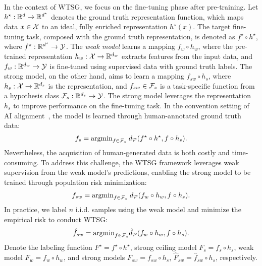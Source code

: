 In the context of WTSG, we focus on the fine-tuning phase after pre-training.
Let $h^\star:\mathbb{R}^d \to \mathbb{R}^{d^\star}$ denotes the ground truth representation function, which maps data $x \in \mathcal{X}$ to an ideal, fully enriched representation $h^\star(x)$. 
The target fine-tuning task, composed with the ground truth representation, is denoted as $f^\star \circ h^\star$, where $f^\star:\mathbb{R}^{d^\star}\to \mathcal{Y}$.
The \textit{weak model} learns a mapping $f_w \circ h_w$, where the pre-trained representation $h_w:\mathcal{X} \to \mathbb{R}^{d_w}$ extracts features from the input data, and $f_w:\mathbb{R}^{d_w} \to \mathcal{Y}$ is fine-tuned using supervised data with ground truth labels.
The strong model, on the other hand, aims to learn a mapping $f_{sw} \circ h_s$, where $h_s: \mathcal{X} \to \mathbb{R}^{d_s}$ is the representation, and $f_{sw} \in \mathcal{F}_{s}$ is a task-specific function from a hypothesis class $\mathcal{F}_{s}: \mathbb{R}^{d_s} \to \mathcal{Y}$.
The strong model leverages the representation $h_s$ to improve performance on the fine-tuning task.
In the convention setting of AI alignment~\citep{ouyang2022training}, 
the model is learned through human-annotated ground truth data:
\begin{align}
    \label{eqn:alignment-population-minimizer}
    f_{s} = \text{argmin}_{f \in \mathcal{F}_{s}}\; d_\mathcal{P}(f^\star \circ h^\star, f \circ h_s).
\end{align}
Nevertheless, the acquisition of human-generated data is both costly and time-consuming.
To address this challenge, the WTSG framework leverages weak supervision from the weak model's predictions, enabling the strong model to be trained through population risk minimization:
\begin{align}
    \label{eqn:fsw-population-minimizer}
    f_{sw} = \text{argmin}_{f \in \mathcal{F}_{s}}\; d_\mathcal{P}(f_w \circ h_w, f \circ h_s).
\end{align}
In practice, we label $n$ i.i.d. samples using the weak model and minimize the empirical risk to conduct WTSG:
\begin{align} \label{eqn:erm}
    \hat{f}_{sw} = \text{argmin}_{f \in \mathcal{F}_s} \hat{d}_\mathcal{P}(f_w \circ h_w, f \circ h_s).
\end{align}
Denote the labeling function $F^\star=f^\star \circ h^\star$, strong ceiling model $F_s=f_s \circ h_s$, weak model $F_w=f_w \circ h_w$, and strong models $F_{sw}=f_{sw} \circ h_s$, $\hat{F}_{sw}=\hat{f}_{sw} \circ h_s$, respectively.


